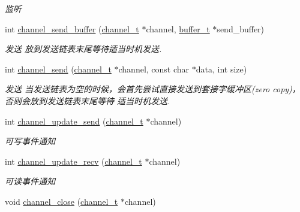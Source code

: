 \begin{DoxyCompactItemize}
\begin{DoxyCompactList}\small\item\em 监听 \end{DoxyCompactList}\item 
int \hyperlink{a00045_a5feb399faecad39ace64e718e9913fbe_a5feb399faecad39ace64e718e9913fbe}{channel\+\_\+send\+\_\+buffer} (\hyperlink{a00050_a2effb3e20d0b7e5f6d5ac42118e0330b_a2effb3e20d0b7e5f6d5ac42118e0330b}{channel\+\_\+t} $\ast$channel, \hyperlink{a00050_aad99a77d28bd81d3d36d0ea569c9482d_aad99a77d28bd81d3d36d0ea569c9482d}{buffer\+\_\+t} $\ast$send\+\_\+buffer)
\begin{DoxyCompactList}\small\item\em 发送 放到发送链表末尾等待适当时机发送. \end{DoxyCompactList}\item 
int \hyperlink{a00045_a455a575d389757e332028a087d701857_a455a575d389757e332028a087d701857}{channel\+\_\+send} (\hyperlink{a00050_a2effb3e20d0b7e5f6d5ac42118e0330b_a2effb3e20d0b7e5f6d5ac42118e0330b}{channel\+\_\+t} $\ast$channel, const char $\ast$data, int size)
\begin{DoxyCompactList}\small\item\em 发送 当发送链表为空的时候，会首先尝试直接发送到套接字缓冲区(zero copy)，否则会放到发送链表末尾等待 适当时机发送. \end{DoxyCompactList}\item 
int \hyperlink{a00045_a92bd8d7a98e233279f011f19f6724794_a92bd8d7a98e233279f011f19f6724794}{channel\+\_\+update\+\_\+send} (\hyperlink{a00050_a2effb3e20d0b7e5f6d5ac42118e0330b_a2effb3e20d0b7e5f6d5ac42118e0330b}{channel\+\_\+t} $\ast$channel)
\begin{DoxyCompactList}\small\item\em 可写事件通知 \end{DoxyCompactList}\item 
int \hyperlink{a00045_ad4aaa94d5f475b4b488ffa1e711ff1e1_ad4aaa94d5f475b4b488ffa1e711ff1e1}{channel\+\_\+update\+\_\+recv} (\hyperlink{a00050_a2effb3e20d0b7e5f6d5ac42118e0330b_a2effb3e20d0b7e5f6d5ac42118e0330b}{channel\+\_\+t} $\ast$channel)
\begin{DoxyCompactList}\small\item\em 可读事件通知 \end{DoxyCompactList}\item 
void \hyperlink{a00045_a44ee392afecbffb25ab7c4de4898df0d_a44ee392afecbffb25ab7c4de4898df0d}{channel\+\_\+close} (\hyperlink{a00050_a2effb3e20d0b7e5f6d5ac42118e0330b_a2effb3e20d0b7e5f6d5ac42118e0330b}{channel\+\_\+t} $\ast$channel)

\end{DoxyCompactItemize}

